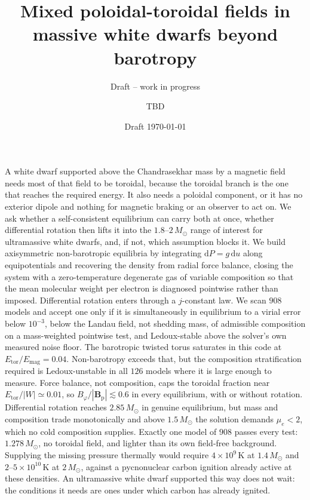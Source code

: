 \documentclass{aa}
\begin{document}
   \title{Mixed poloidal-toroidal fields in massive white dwarfs
          beyond barotropy}

   \subtitle{Draft -- work in progress}

   \author{TBD
          }


   \date{Draft \today}

   \abstract
   {A white dwarf supported above the Chandrasekhar mass by a magnetic
    field needs most of that field to be toroidal, because the toroidal
    branch is the one that reaches the required energy. It also needs a
    poloidal component, or it has no exterior dipole and nothing for
    magnetic braking or an observer to act on.}
   {We ask whether a self-consistent equilibrium can carry both at once,
    whether differential rotation then lifts it into the $1.8$--$2\,M_\odot$
    range of interest for ultramassive white dwarfs, and, if not, which
    assumption blocks it.}
   {We build axisymmetric non-barotropic equilibria by integrating
    $\mathrm{d}P = g\,\mathrm{d}u$ along equipotentials and recovering the
    density from radial force balance, closing the system with a
    zero-temperature degenerate gas of variable composition so that the
    mean molecular weight per electron is diagnosed pointwise rather than
    imposed. Differential rotation enters through a $j$-constant law. We
    scan $908$ models and accept one only if it is simultaneously in
    equilibrium to a virial error below $10^{-3}$, below the Landau field,
    not shedding mass, of admissible composition on a mass-weighted
    pointwise test, and Ledoux-stable above the solver's own measured
    noise floor.}
   {The barotropic twisted torus saturates in this code at
    $E_{\mathrm{tor}}/E_{\mathrm{mag}} = 0.04$. Non-barotropy exceeds
    that, but the composition stratification required is Ledoux-unstable
    in all $126$ models where it is large enough to measure. Force balance,
    not composition, caps the toroidal fraction near
    $E_{\mathrm{tor}}/|W| \simeq 0.01$, so
    $B_\varphi/|\mathbf{B}_{\mathrm{p}}| \lesssim 0.6$ in every
    equilibrium, with or without rotation. Differential rotation reaches
    $2.85\,M_\odot$ in genuine equilibrium, but mass and composition trade
    monotonically and above $1.5\,M_\odot$ the solution demands
    $\mu_e < 2$, which no cold composition supplies. Exactly one model of
    $908$ passes every test: $1.278\,M_\odot$, no toroidal field, and
    lighter than its own field-free background.}
   {Supplying the missing pressure thermally would require
    $4\times10^9$\,K at $1.4\,M_\odot$ and $2$--$5\times10^{10}$\,K at
    $2\,M_\odot$, against a pycnonuclear carbon ignition already active at
    these densities. An ultramassive white dwarf supported this way does
    not wait: the conditions it needs are ones under which carbon has
    already ignited.}
\end{document}
